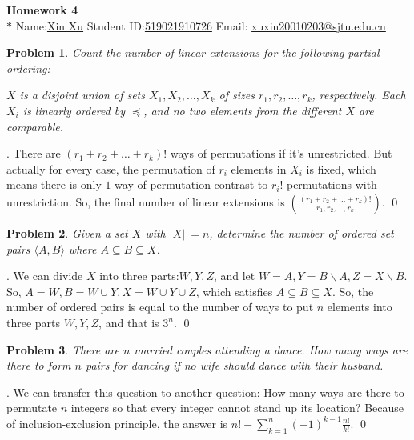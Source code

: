 \documentclass[12pt]{article}
\date{Feb 14, 2012}
\newtheorem{hw}{Problem}
\newenvironment{sol}
  {\par\vspace{3mm}\noindent{\it Solution}.}
  {\qed}
\begin{document}
\begin{center}
{\LARGE\bf Homework 4}\\
\vspace{2mm}
\footnotesize{$*$ Name:\underline{Xin Xu}  \quad Student ID:\underline{519021910726} \quad Email: \underline{xuxin20010203@sjtu.edu.cn}}
\vspace{2mm}

\end{center}


\begin{hw}
Count the number of linear extensions for the following partial ordering:

 $X$ is a disjoint union of sets $X_1, X_2,\ldots, X_k$ of sizes $r_1, r_2,\ldots, r_k$, respectively. Each $X_i$ is linearly ordered by $\preceq$, and no two elements from the different $X$ are comparable.
\end{hw}

\begin{sol}
    There are $(r_1+r_2+\ldots +r_k)!$ ways of permutations if it's unrestricted. But actually for every case, the permutation of $r_i$ elements in $X_i$ is fixed, which means there is only $1$ way of permutation contrast to $r_i!$ permutations with unrestriction.
    So, the final number of linear extensions is $\binom{(r_1+r_2+\ldots +r_k)!}{r_1, r_2,\ldots, r_k}$.
\end{sol}

\begin{hw}
Given a set $X$ with $|X|~=n$, determine the number of ordered set pairs $\langle A, B\rangle $ where $A \subseteq  B \subseteq X$.
\end{hw}

\begin{sol}
    We can divide $X$ into three parts:$W,Y,Z$, and let $W=A,Y=B\backslash A,Z=X\backslash B$. So, $A=W,B=W\cup Y,X=W\cup Y\cup Z$, which satisfies $A\subseteq B\subseteq X$.
    So, the number of ordered pairs is equal to the number of ways to put $n$ elements into three parts $W,Y,Z$, and that is $3^n$.
\end{sol}

\begin{hw}
There are $n$ married couples attending a dance. How many ways are there to form $n$ pairs for dancing if no wife should dance with their husband.
\end{hw}

\begin{sol}
    We can transfer this question to another question: How many ways are there to permutate $n$ integers so that every integer cannot stand up its location? 
    Because of inclusion-exclusion principle, the answer is $n!-\sum_{k = 1}^{n} (-1)^{k-1} \frac{n!}{k!} $.
\end{sol}  
\end{document}
